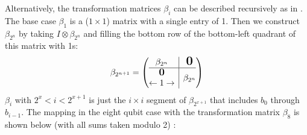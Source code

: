 \documentclass[twoside]{article}
\begin{document}
Alternatively, the transformation matrices $\beta_i$ can be described recursively as in \cite{seeley}. The base case $\beta_1$ is a ($1 \times 1$) matrix with a single entry of 1. Then we construct $\beta_{2^n}$ by taking $I \otimes \beta_{2^n}$ and filling the bottom row of the bottom-left quadrant of this matrix with 1s:
\begin{equation}
        \beta_{2^{n+1}} = \left( \begin{array}{@{}c|c@{}} 
                        \beta_{2^n}  & \begin{matrix}
                                \mbox{\normalfont \Large \bfseries 0}\\
                        \end{matrix} \\
                \hline
                \begin{matrix} \mbox{\normalfont\large\bfseries 0}\\
                        \leftarrow 1 \rightarrow 
                \end{matrix} &  \beta_{2^n}
        \end{array}
         \right)
\end{equation}
$\beta_i$ with $2^x < i < 2^{x+1}$ is just the $i \times i$ segment of $\beta_{2^{x+1}}$ that includes $b_0$ through $b_{i-1}$. The mapping in the eight qubit case with the transformation matrix $\beta_8$ is shown below (with all sums taken modulo 2) \cite{tranter2018}:
\end{document}
